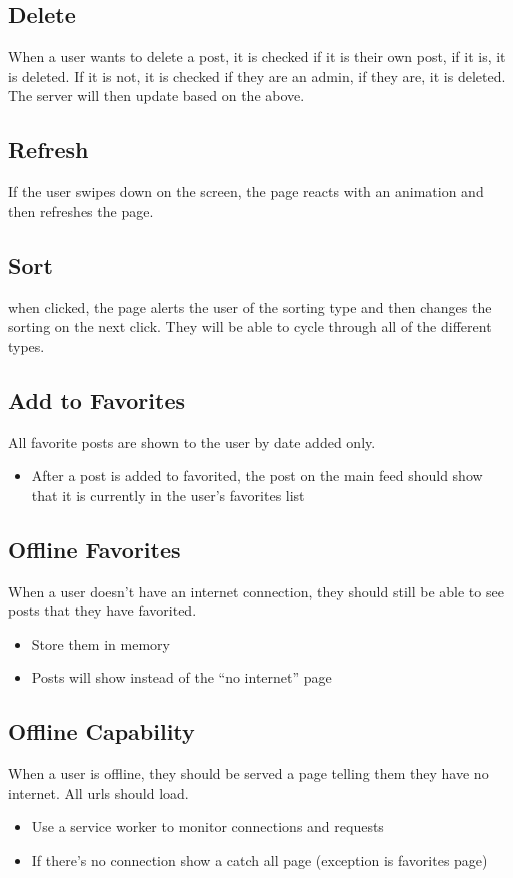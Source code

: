 \documentclass[12pt]{article}
\begin{document}
\subsection{Delete}
When a user wants to delete a post, it is checked if it is their own post, if it
is, it is deleted. If it is not, it is checked if they are an admin, if they
are, it is deleted. The server will then update based on the above.

\subsection{Refresh}
If the user swipes down on the screen, the page reacts with an animation and
then refreshes the page.

\subsection{Sort}
when clicked, the page alerts the user of the sorting type and then changes the
sorting on the next click. They will be able to cycle through all of the
different types.

\subsection{Add to Favorites}
All favorite posts are shown to the user by date added only.
\begin{itemize}
  \item After a post is added to favorited, the post on the main feed should show that
it is currently in the user’s favorites list
\end{itemize}

\subsection{Offline Favorites}
When a user doesn’t have an internet connection, they should still be able to
see posts that they have favorited.
\begin{itemize}
  \item Store them in memory
  \item Posts will show instead of the “no internet” page
\end{itemize}

\subsection{Offline Capability}
When a user is offline, they should be served a page telling them they have no
internet. All urls should load.
\begin{itemize}
  \item Use a service worker to monitor connections and requests
  \item If there’s no connection show a catch all page (exception is favorites page)
\end{itemize}
\end{document}
